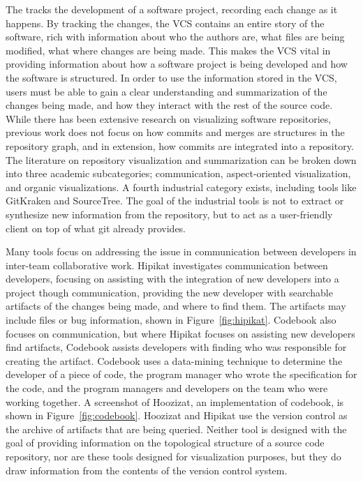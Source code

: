 The  tracks the development of a
software project, recording each change as it happens. By tracking the
changes, the VCS contains an entire story of the software, rich with
information about who the authors are, what files are being modified,
what where changes are being made. This makes the VCS vital in providing
information about how a software project is being developed and how the
software is structured. In order to use the information stored in the
VCS, users must be able to gain a clear understanding and summarization
of the changes being made, and how they interact with the rest of the
source code. While there has been extensive research on visualizing
software repositories, previous work does not focus on how commits and
merges are structures in the repository graph, and in extension, how
commits are integrated into a repository. The literature on repository
visualization and summarization can be broken down into three academic
subcategories; communication\cite{Cubranic2005,Begel2010},
aspect-oriented visualization\cite{Ambros2005,Burch2005,Ambros2009}, and
organic visualizations\cite{ogawa09,Caudwell2010}. A fourth industrial
category exists, including tools like GitKraken and SourceTree. The goal
of the industrial tools is not to extract or synthesize new information
from the repository, but to act as a user-friendly client on top of what
git already provides.

Many tools focus on addressing the issue in communication between
developers in inter-team collaborative work. Hipikat\cite{Cubranic2005}
investigates communication between developers, focusing on assisting
with the integration of new developers into a project though
communication, providing the new developer with searchable artifacts of
the changes being made, and where to find them. The artifacts may
include files or bug information, shown in Figure~\ref{fig:hipikat}.
Codebook\cite{Begel2010} also focuses on communication, but where
Hipikat focuses on assisting new developers find artifacts, Codebook
assists developers with finding who was responsible for creating the
artifact. Codebook uses a data-mining technique to determine the
developer of a piece of code, the program manager who wrote the
specification for the code, and the program managers and developers on
the team who were working together. A screenshot of Hoozizat, an
implementation of codebook, is shown in Figure~\ref{fig:codebook}.
Hoozizat and Hipikat use the version control as the archive of artifacts
that are being queried. Neither tool is designed with the goal of
providing information on the topological structure of a source code
repository, nor are these tools designed for visualization purposes, but
they do draw information from the contents of the version control
system.

